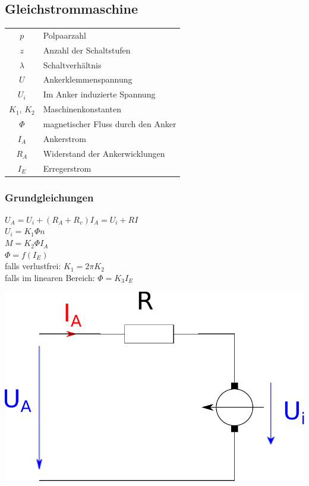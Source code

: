 \documentclass[fs, footer]{latex4ei}
\begin{document}
\begin{multicols}{4}
		\subsection{Gleichstrommaschine}
		
		\begin{tabular}{cl}
		$p$ & Polpaarzahl \\
		$z$ & Anzahl der Schaltstufen \\
		$\lambda$ & Schaltverhältnis \\
		$U$ & Ankerklemmenspannung \\
		$U_i$ & Im Anker induzierte Spannung \\
		$K_1$, $K_2$ & Maschinenkonstanten \\
		$\Phi$ & magnetischer Fluss durch den Anker \\
		$I_A$ & Ankerstrom \\
		$R_A$ & Widerstand der Ankerwicklungen \\
		$I_E$ & Erregerstrom
		\end{tabular}
		
		\subsubsection{Grundgleichungen}
		$U_A = U_i + (R_A + R_v) I_A = U_i + RI$\\
		$U_i = K_1 \Phi n$\\
		$M = K_2 \Phi I_A$\\
		$\Phi = f(I_E)$\\
		falls verlustfrei: $K_1 = 2 \pi K_2$ \\
		falls im linearen Bereich: $\Phi = K_3 I_E$ \\
		
		\begin{center}
		\includegraphics[scale=.2]{./img/ersatzschaltbild_gleichstrommaschine.pdf}
		\end{center}
		

\end{multicols}
\end{document}
